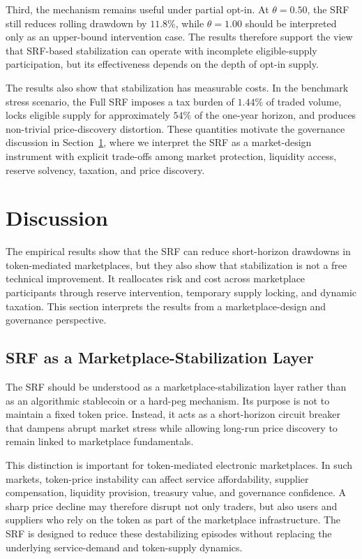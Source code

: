 \documentclass[a4paper,fleqn]{cas-dc}
\begin{document}
Third, the mechanism remains useful under partial opt-in. At \(\theta=0.50\), the SRF still reduces rolling drawdown by \(11.8\%\), while \(\theta=1.00\) should be interpreted only as an upper-bound intervention case. The results therefore support the view that SRF-based stabilization can operate with incomplete eligible-supply participation, but its effectiveness depends on the depth of opt-in supply.

The results also show that stabilization has measurable costs. In the benchmark stress scenario, the Full SRF imposes a tax burden of \(1.44\%\) of traded volume, locks eligible supply for approximately \(54\%\) of the one-year horizon, and produces non-trivial price-discovery distortion. These quantities motivate the governance discussion in Section~\ref{sec:discussion}, where we interpret the SRF as a market-design instrument with explicit trade-offs among market protection, liquidity access, reserve solvency, taxation, and price discovery.

\section{Discussion}
\label{sec:discussion}

The empirical results show that the SRF can reduce short-horizon drawdowns in token-mediated marketplaces, but they also show that stabilization is not a free technical improvement. It reallocates risk and cost across marketplace participants through reserve intervention, temporary supply locking, and dynamic taxation. This section interprets the results from a marketplace-design and governance perspective.

\subsection{SRF as a Marketplace-Stabilization Layer}
\label{subsec:discussion_marketplace_layer}

The SRF should be understood as a marketplace-stabilization layer rather than as an algorithmic stablecoin or a hard-peg mechanism. Its purpose is not to maintain a fixed token price. Instead, it acts as a short-horizon circuit breaker that dampens abrupt market stress while allowing long-run price discovery to remain linked to marketplace fundamentals.

This distinction is important for token-mediated electronic marketplaces. In such markets, token-price instability can affect service affordability, supplier compensation, liquidity provision, treasury value, and governance confidence. A sharp price decline may therefore disrupt not only traders, but also users and suppliers who rely on the token as part of the marketplace infrastructure. The SRF is designed to reduce these destabilizing episodes without replacing the underlying service-demand and token-supply dynamics.
\end{document}
